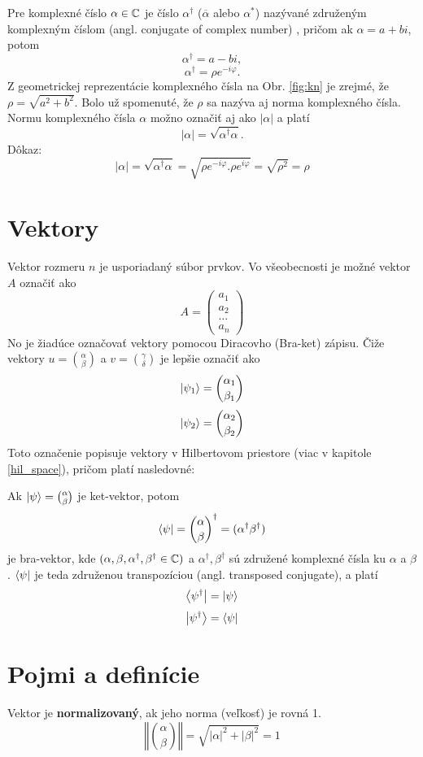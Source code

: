 Pre komplexné číslo \(\alpha \in \mathbb{C}\) je číslo \(\alpha^{\dag}\) (\(\overline{\alpha}\) alebo \(\alpha^{*}\)) nazývané združeným komplexným číslom (angl. conjugate of complex number) \cite{Tit06}, pričom ak \(\alpha = a + bi\), potom 
\[\alpha^{\dag} = a - bi,\] 
\[\alpha^{\dag} = \rho e^{-i\varphi}.\]
Z geometrickej reprezentácie komplexného čísla na Obr. \ref{fig:kn} je zrejmé, že \(\rho = \sqrt{a^2 + b^2}\).
Bolo už spomenuté, že \(\rho\) sa nazýva aj norma komplexného čísla.
Normu komplexného čísla \(\alpha\) možno označiť aj ako \(|\alpha|\) a platí
\[|\alpha| = \sqrt{\alpha^{\dag}\alpha}.\]
Dôkaz:
\[|\alpha| = \sqrt{\alpha^{\dag}\alpha} = \sqrt{\rho e^{-i\varphi}.\rho e^{i\varphi}} = \sqrt{\rho^{2}} = \rho\]

\section{Vektory}
\label{vektory}

Vektor rozmeru \(n\) je usporiadaný súbor prvkov.
Vo všeobecnosti je možné vektor \(A\) označiť ako 
\[A = \begin{pmatrix}
		a_{1} \\
		a_{2}\\
		\dots \\
		a_{n}
     \end{pmatrix}\]
No je žiadúce označovať vektory pomocou Diracovho (Bra-ket) zápisu.
Čiže vektory \(u = \binom{\alpha}{\beta}\) a \(v = \binom{\gamma}{\delta}\) je lepšie označiť ako 
\[\Ket{\psi_1} = \binom{\alpha_1}{\beta_1}\]
\[\Ket{\psi_2} = \binom{\alpha_2}{\beta_2}\]
Toto označenie popisuje vektory v Hilbertovom priestore (viac v kapitole \ref{hil_space}), pričom platí nasledovné:

Ak \(\Ket{\psi} = \binom{\alpha}{\beta}\) je ket-vektor, potom 
\[\Bra{\psi} = {\binom{\alpha}{\beta}}^{\dag} = (\alpha^{\dag} \beta^{\dag})\]
je  bra-vektor, kde \( ( \alpha, \beta, \alpha^{\dag}, \beta^{\dag} \in \mathbb{C} ) \) a \(\alpha^{\dag}, \beta^{\dag}\) sú združené komplexné čísla ku \(\alpha\) a \(\beta\).
\(\Bra{\psi}\) je teda združenou transpozíciou (angl. transposed conjugate), a platí
\[\Bra{\psi^{\dag}} = \Ket{\psi}\]
\[\Ket{\psi^{\dag}} = \Bra{\psi}\]


\section{Pojmi a definície}
Vektor je \textbf{normalizovaný}, ak jeho norma (veľkosť) je rovná 1.
\[\left\Vert \binom{\alpha}{\beta} \right\Vert = \sqrt{|\alpha|^2 + |\beta|^2}= 1\]

